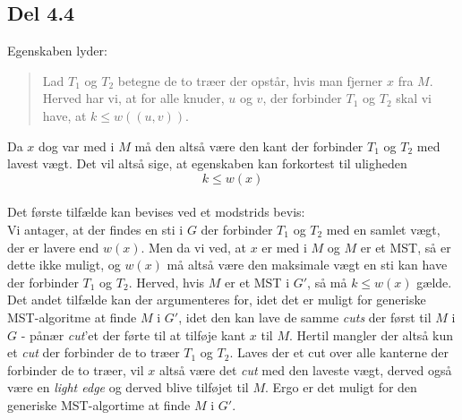 \documentclass{report}
\begin{document}
\subsection*{Del 4.4}
Egenskaben lyder:
\begin{quote}
    Lad $T_1$ og $T_2$ betegne de to træer der opstår, hvis man fjerner $x$ fra $M$. Herved har vi, at for alle knuder, $u$ og $v$, der forbinder $T_1$ og $T_2$ skal vi have, at $k \leq w((u, v))$. 
\end{quote}
Da $x$ dog var med i $M$ må den altså være den kant der forbinder $T_1$ og $T_2$ med lavest vægt. Det vil altså sige, at egenskaben kan forkortest til uligheden 
$$k \leq w(x)$$ \\
Det første tilfælde kan bevises ved et modstrids bevis: \\
Vi antager, at der findes en sti i $G$ der forbinder $T_1$ og $T_2$ med en samlet vægt, der er lavere end $w(x)$. Men da vi ved, at $x$ er med i $M$ og $M$ er et MST, så er dette ikke muligt, og $w(x)$ må altså være den maksimale vægt en sti kan have der forbinder $T_1$ og $T_2$. Herved, hvis $M$ er et MST i $G'$, så må $k \leq w(x)$ gælde. \\
Det andet tilfælde kan der argumenteres for, idet det er muligt for generiske MST-algoritme at finde $M$ i $G'$, idet den kan lave de samme \textit{cuts} der først til $M$ i $G$ - pånær \textit{cut}'et der førte til at tilføje kant $x$ til $M$. Hertil mangler der altså kun et \textit{cut} der forbinder de to træer $T_1$ og $T_2$. Laves der et cut over alle kanterne der forbinder de to træer, vil $x$ altså være det \textit{cut} med den laveste vægt, derved også være en \textit{light edge} og derved blive tilføjet til $M$. Ergo er det muligt for den generiske MST-algortime at finde $M$ i $G'$.
\end{document}
